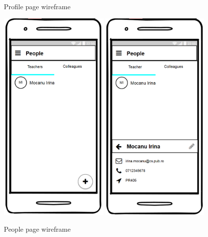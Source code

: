 \begin{figure}[!ht]
\begin{minipage}[b]{0.3\textwidth}
        \caption{Profile page wireframe}
        \label{4:fig:balsamiq_profile}
    \end{minipage}
    \hfill
    \begin{minipage}[b]{0.63\textwidth}
        \captionsetup{justification=centering}
        \includegraphics[width=0.485\textwidth]{figures/app/balsamiq/people.png}
        \includegraphics[width=0.48\textwidth]{figures/app/balsamiq/teacher.png}
        \caption{People page \newline wireframe}
        \label{4:fig:balsamiq_people}
    \end{minipage}
\end{figure}

